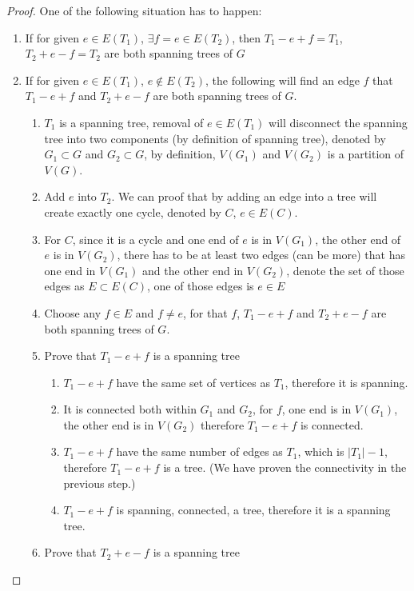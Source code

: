 				\begin{proof}
					One of the following situation has to happen:
					\begin{enumerate}
						\item If for given $e \in E(T_1)$, $\exists f = e \in E(T_2)$, then $T_1 - e + f = T_1$, $T_2 + e - f = T_2$ are both spanning trees of $G$
						\item If for given $e \in E(T_1)$, $e \notin E(T_2)$, the following will find an edge $f$ that $T_1 - e + f$ and $T_2 + e - f$ are both spanning trees of $G$.
						\begin{enumerate}
							\item $T_1$ is a spanning tree, removal of $e \in E(T_1)$ will disconnect the spanning tree into two components (by definition of spanning tree), denoted by $G_1 \subset G$ and $G_2 \subset G$, by definition, $V(G_1)$ and $V(G_2)$ is a partition of $V(G)$.
							\item Add $e$ into $T_2$. We can proof that by adding an edge into a tree will create exactly one cycle, denoted by $C$, $e \in E(C)$.
							\item For $C$, since it is a cycle and one end of $e$ is in $V(G_1)$, the other end of $e$ is in $V(G_2)$, there has to be at least two edges (can be more) that has one end in $V(G_1)$ and the other end in $V(G_2)$, denote the set of those edges as $E \subset E(C)$, one of those edges is $e \in E$
							\item Choose any $f \in E$ and $f \neq e$, for that $f$, $T_1 - e + f$ and $T_2 + e - f$ are both spanning trees of $G$.
							\item Prove that $T_1 - e + f$ is a spanning tree
							\begin{enumerate}
								\item $T_1 - e + f$ have the same set of vertices as $T_1$, therefore it is spanning.
								\item It is connected both within $G_1$ and $G_2$, for $f$, one end is in $V(G_1)$, the other end is in $V(G_2)$ therefore $T_1 - e + f$ is connected.
								\item $T_1 - e + f$ have the same number of edges as $T_1$, which is $|T_1| - 1$, therefore $T_1 - e + f$ is a tree. (We have proven the connectivity in the previous step.)
								\item $T_1 - e + f$ is spanning, connected, a tree, therefore it is a spanning tree.
							\end{enumerate}
							\item Prove that $T_2 + e - f$ is a spanning tree

\end{enumerate}
\end{enumerate}
\end{proof}
